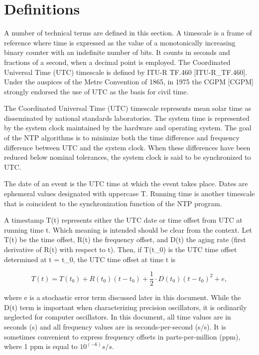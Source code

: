 \chapter{Definitions}

A number of technical terms are defined in this section. A timescale
is a frame of reference where time is expressed as the value of a
monotonically increasing binary counter with an indefinite number of
bits. It counts in seconds and fractions of a second, when a decimal
point is employed. The Coordinated Universal Time (UTC) timescale is
defined by ITU-R TF.460 [ITU-R\_TF.460]. Under the auspices of the
Metre Convention of 1865, in 1975 the CGPM [CGPM] strongly endorsed
the use of UTC as the basis for civil time.

The Coordinated Universal Time (UTC) timescale represents mean solar
time as disseminated by national standards laboratories. The system
time is represented by the system clock maintained by the hardware
and operating system. The goal of the NTP algorithms is to minimize
both the time difference and frequency difference between UTC and the
system clock. When these differences have been reduced below nominal
tolerances, the system clock is said to be synchronized to UTC.

The date of an event is the UTC time at which the event takes place.
Dates are ephemeral values designated with uppercase T. Running time
is another timescale that is coincident to the synchronization
function of the NTP program.

A timestamp T(t) represents either the UTC date or time offset from
UTC at running time t. Which meaning is intended should be clear
from the context. Let T(t) be the time offset, R(t) the frequency
offset, and D(t) the aging rate (first derivative of R(t) with
respect to t). Then, if T(t\_0) is the UTC time offset determined at
t = t\_0, the UTC time offset at time t is

$$
T(t) = T(t_0) + R(t_0)(t - t_0) + \frac{1}{2} \cdot D(t_0)(t - t_0)^2 + e,
$$

where e is a stochastic error term discussed later in this document.
While the D(t) term is important when characterizing precision
oscillators, it is ordinarily neglected for computer oscillators. In
this document, all time values are in seconds (s) and all frequency
values are in seconds-per-second (s/s). It is sometimes convenient
to express frequency offsets in parts-per-million (ppm), where 1 ppm
is equal to $10^(-6) s/s$.

